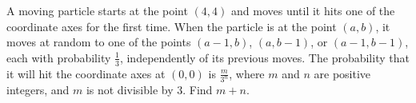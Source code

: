 A moving particle starts at the point $\left(4,4\right)$ and moves until it hits one of the coordinate axes for the first time. When the particle is at the point $\left(a,b\right)$, it moves at random to one of the points $\left(a-1,b\right)$, $\left(a,b-1\right)$, or $\left(a-1,b-1\right)$, each with probability $\tfrac{1}{3}$, independently of its previous moves. The probability that it will hit the coordinate axes at $\left(0,0\right)$ is $\tfrac{m}{3^n}$, where $m$ and $n$ are positive integers, and $m$ is not divisible by $3$. Find $m+n$.